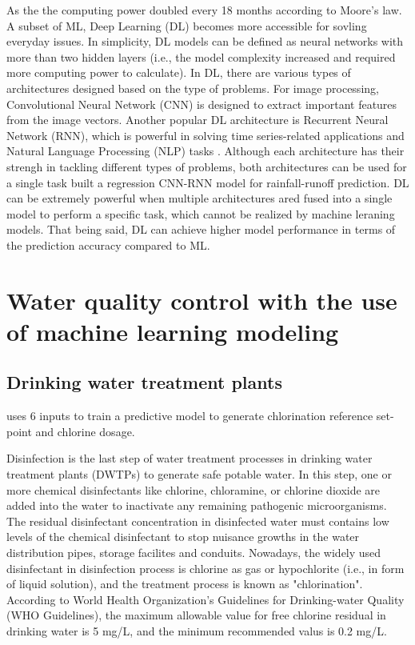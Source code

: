 As the the computing power doubled every 18 months according to Moore's law. A subset of ML, Deep Learning (DL) becomes more accessible for sovling everyday issues. In simplicity, DL models can be defined as neural networks with more than two hidden layers (i.e., the model complexity increased and required more computing power to calculate). In DL, there are various types of architectures designed based on the type of problems. For image processing, Convolutional Neural Network (CNN) is designed to extract important features from the image vectors. Another popular DL architecture is Recurrent Neural Network (RNN), which is powerful in solving time series-related applications and Natural Language Processing (NLP) tasks \citep{liERNNDesignOptimization2018}. Although each architecture has their strengh in tackling different types of problems, both architectures can be used for a single task \citet{liPredictionFlowBased2022} built a regression CNN-RNN model for rainfall-runoff prediction. DL can be extremely powerful when multiple architectures ared fused into a single model to perform a specific task, which cannot be realized by machine leraning models. That being said, DL can achieve higher model performance in terms of the prediction accuracy compared to ML. 



\section{Water quality control with the use of machine learning modeling}
\subsection{Drinking water treatment plants}
\citet{librantzArtificialNeuralNetworks2018} uses 6 inputs to train a predictive model to generate chlorination reference set-point and chlorine dosage. 

Disinfection is the last step of water treatment processes in drinking water treatment plants (DWTPs) to generate safe potable water. In this step, one or more chemical disinfectants like chlorine, chloramine, or chlorine dioxide are added into the water to inactivate any remaining pathogenic microorganisms. The residual disinfectant concentration in disinfected water must contains low levels of the chemical disinfectant to stop nuisance growths in the water distribution pipes, storage facilites and conduits. Nowadays, the widely used disinfectant in disinfection process is chlorine as gas or hypochlorite (i.e., in form of liquid solution), and the treatment process is known as "chlorination". According to World Health Organization's Guidelines for Drinking-water Quality (WHO Guidelines), the maximum allowable value for free chlorine residual in drinking water is 5 mg/L, and the minimum recommended valus is 0.2 mg/L. 

